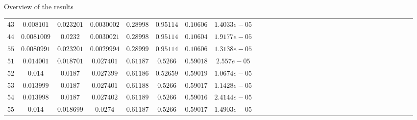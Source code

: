 \documentclass[t,12pt,english
\ifx\beamermode\undefined\else,\beamermode\fi
]{beamer}
\begin{document}
\begin{frame}{Overview of the results}
\begin{table}[!htbp]
\begin{tabular}{c c c c c c c c c c c c c c c c c c c c c c c c c c c c c c c }
$43 $&$0.008101$&$0.023201   $&$0.0030002$&$ 0.28998$&$ 0.95114$&$ 0.10606$&$1.4033e-05$\\
$44 $&$0.0081009$&$  0.0232  $&$ 0.0030021$&$0.28998$&$  0.95114$&$ 0.10604$&$1.9177e-05$\\
$55 $&$0.0080991$&$ 0.023201 $&$  0.0029994 $&$0.28999$&$0.95114 $&$0.10606$&$1.3138e-05$\\
$51 $&$0.014001$&$0.018701   $&$ 0.027401$&$ 0.61187$&$ 0.5266$&$0.59018$&$2.557e-05$\\
$52 $&$0.014    $&$  0.0187    $&$0.027399$&$   0.61186$&$0.52659$&$0.59019$&$1.0674e-05$\\
$53 $&$0.013999$&$  0.0187    $&$0.027401$&$ 0.61188$&$0.5266$&$0.59017$&$1.1428e-05$\\
$54 $&$0.013998$&$   0.0187$&$    0.027402$&$  0.61189 $&$0.5266$&$0.59016$&$2.4144e-05$\\
$55 $&$0.014    $&$0.018699   $&$   0.0274$&$ 0.61187$&$ 0.5266$&$0.59017$&$1.4903e-05$\\


\hline 

\end{tabular}
\end{table}
   


\end{frame}
\end{document}

